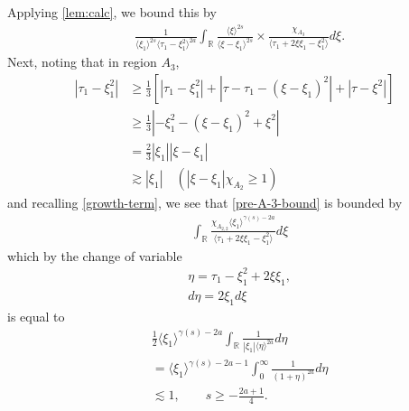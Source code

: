 \documentclass[12pt,reqno]{amsart}
\numberwithin{equation}{section}  %
\numberwithin{figure}{section}
\newcommand{\rr}{\mathbb{R}}
\theoremstyle{plain}
\theoremstyle{definition}
\theoremstyle{remark}
\begin{document}
Applying \autoref{lem:calc}, we bound this by
%
%
\begin{equation}
  \label{pre-A-3-bound}
\begin{split}
  &  \frac{1}{\langle \xi_{1} \rangle ^{2s}
  \langle \tau_{1} - \xi_{1}^{2}  \rangle
  ^{2a}} \int_{\rr} \frac{\langle \xi \rangle ^{2s}}{\langle
  \xi - \xi_{1}\rangle ^{2s}}  \times \frac{\chi_{A_{3}}}{\langle
  \tau_{1} + 2 \xi \xi_{1} - \xi_{1}^{2} \rangle } d \xi.
\end{split}
\end{equation}
%
Next, noting that in region $A_{3}$,
%
%
\begin{equation*}
\begin{split}
  | \tau_{1} -\xi_{1}^{2} |
  & \ge \frac{1}{3} \left[ | \tau_{1} - \xi_{1}^{2} | + | \tau - \tau_{1} -
  (\xi - \xi_{1})^{2} | + | \tau - \xi^{2} | \right]
  \\
  & \ge \frac{1}{3} | - \xi_{1}^{2} - (\xi - \xi_{1})^{2} + \xi^{2} |
  \\
  & = \frac{2}{3} | \xi_{1} | | \xi - \xi_{1} |
  \\
  & \gtrsim | \xi_{1} | \quad (| \xi - \xi_{1} |\chi_{A_{2}} \ge 1)
\end{split}
\end{equation*}
%
%
and recalling \eqref{growth-term}, we see that \eqref{pre-A-3-bound} is bounded by
\begin{equation*}
\begin{split}
  &  \int_{\rr} \frac{\chi_{A_{2,2}} \langle \xi_{1} \rangle ^{\gamma(s) -2a}}{\langle
  \tau_{1} + 2 \xi \xi_{1} - \xi_{1}^{2} \rangle } d \xi
\end{split}
\end{equation*}
%
which by the change of variable
%
%
\begin{equation*}
\begin{split}
  & \eta = \tau_{1} - \xi_{1}^{2} + 2 \xi \xi_{1},
  \\
  & d \eta = 2 \xi_{1} d \xi
\end{split}
\end{equation*}
%
%
is equal to
%
%
\begin{equation*}
\begin{split}
  & \frac{1}{2} \langle \xi_{1} \rangle ^{\gamma(s)-2a}  \int_{\rr} 
  \frac{1}{| \xi_{1} |\langle \eta \rangle ^{2a} }d \eta
  \\
  & = \langle \xi_{1} \rangle ^{\gamma(s)-2a-1} \int_{0}^{\infty} \frac{1}{(1 + \eta
  )^{2a}}d \eta
  \\
  & \lesssim 1, \qquad s \ge -\frac{2a+1}{4}.
\end{split}
\end{equation*}
%
%
\end{document}
